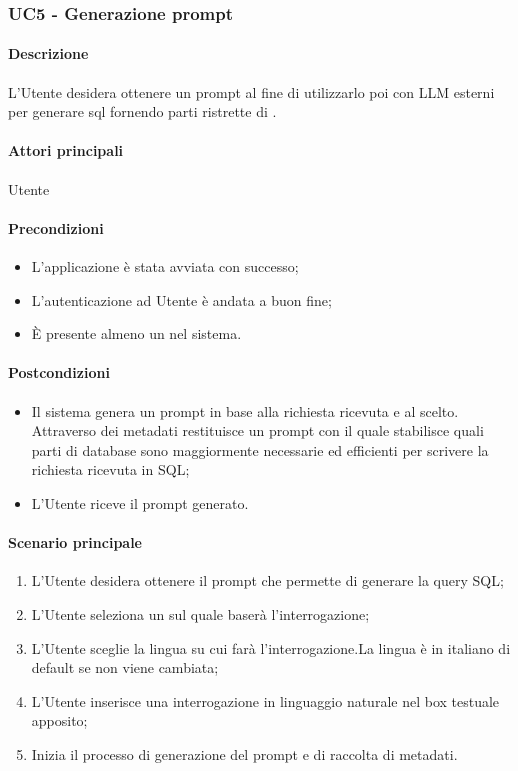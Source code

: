 \subsubsection{UC5 - Generazione prompt}\label{UC5}
\paragraph*{Descrizione}
L’Utente desidera ottenere un prompt al fine di utilizzarlo poi con LLM esterni per generare  sql fornendo parti ristrette di .

\paragraph*{Attori principali}
Utente

\paragraph*{Precondizioni}
\begin{itemize}
  \item L'applicazione è stata avviata con successo;
  \item L’autenticazione ad Utente è andata a buon fine;
  \item È presente almeno un  nel sistema.
\end{itemize}

\paragraph*{Postcondizioni}
\begin{itemize}
  \item Il sistema genera un prompt in base alla richiesta ricevuta e al  scelto. Attraverso dei metadati restituisce un prompt con il quale stabilisce quali parti di database sono maggiormente necessarie ed efficienti per scrivere la richiesta ricevuta in SQL;
  \item L’Utente riceve il prompt generato.
\end{itemize}

\paragraph*{Scenario principale}
\begin{enumerate}
  \item L’Utente desidera ottenere il prompt che permette di generare la query SQL;
  \item L’Utente seleziona un  sul quale baserà l’interrogazione;
  \item L’Utente sceglie la lingua su cui farà l’interrogazione.La lingua è in italiano di default se non viene cambiata;
  \item L’Utente inserisce una interrogazione in linguaggio naturale nel box testuale apposito;
  \item Inizia il processo di generazione del prompt e di raccolta di metadati.
\end{enumerate}

